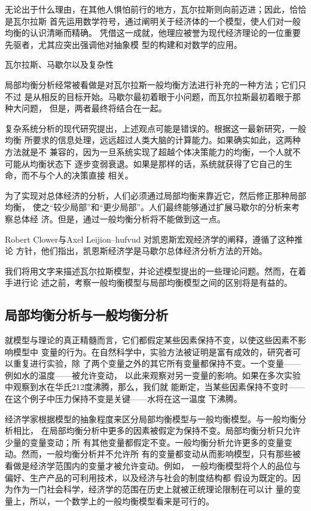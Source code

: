 无论出于什么理由，在其他人惧怕前行的地方，瓦尔拉斯则向前迈进；因此，恰恰是瓦尔拉斯
首先运用数学符号，通过阐明关于经济体的一个模型，使人们对一般均衡的认识清晰而精确。
凭借这一成就，他理应被誉为现代经济理论的一位重要先驱者，尤其应突出强调他对抽象模
型的构建和对数学的应用。

\begin{mybox}{瓦尔拉斯、马歇尔以及复杂性}
  \begin{multicols}{2}
    局部均衡分析经常被看做是对瓦尔拉斯一般均衡方法进行补充的一种方法；它们只不过
    是从相反的目标开始。马歇尔最初着眼于小问题，而瓦尔拉斯最初着眼于那种大问题，
    但是，两者最终将结合在一起。

    复杂系统分析的现代研究提出，上述观点可能是错误的。根据这一最新研究，一般均衡
    所要求的信息处理，远远超过人类大脑的计算能力。如果确实如此，这两种方法就是不
    兼容的，因为一旦系统实现了超越个体决策能力的均衡，一个人就不可能从均衡状态下
    逐步变弱衰退。如果是那样的话，系统就获得了它自己的生命，而不与个人的决策直接
    相关。

    为了实现对总体经济的分析，人们必须通过局部均衡来靠近它，然后修正那种局部均衡，
    使之“较少局部”和“更少局部”。人们最终能够通过扩展马歇尔的分析来考察总体经
    济。但是，通过一般均衡分析将不能做到这一点。

    Robert Clower与Axel Leijion--hufvud 对凯恩斯宏观经济学的阐释，遵循了这种推论
    方针，他们指出，凯恩斯经济学是马歇尔总体经济分析方法的开始。
  \end{multicols}
\end{mybox}

我们将用文字来描述瓦尔拉斯模型，并论述模型提出的一些理论问题。然而，在着手进行论
述之前，考察一般均衡模型与局部均衡模型之间的区别将是有益的。


\subsection{局部均衡分析与一般均衡分析}

就模型与理论的真正精髓而言，它们都假定某些因素保持不变，以使这些因素不影响模型中
变量的行为。在自然科学中，实验方法被证明是富有成效的，研究者可以重复进行实验，除
了两个变量之外的其它所有变量都保持不变。一个变量——例如水的温度——被允许变动，
以此来观察对另一变量的影响。如果在多次实验中观察到水在华氏212度沸腾，那么，我们就
能断定，当某些因素保持不变时——在这个例子中压力保持不变是关键——水将在这一温度
下沸腾。

经济学家根据模型的抽象程度来区分局部均衡模型与一般均衡模型。与一般均衡分析相比，
在局部均衡分析中更多的因素被假定为保持不变。局部均衡分析只允许少量的变量变动；所
有其他变量都假定不变。一般均衡分析允许更多的变量变动。然而，一般均衡分析并不允许所
有的变量都变动从而影响模型，只有那些被看做是经济学范围内的变量才被允许变动。例如，
一般均衡模型将个人的品位与偏好、生产产品的可利用技术，以及经济与社会的制度结构都
假设为既定的。因为作为一门社会科学，经济学的范围在历史上就被正统理论限制在可以计
量的变量上，所以，一个数学上的一般均衡模型看来是可行的。

